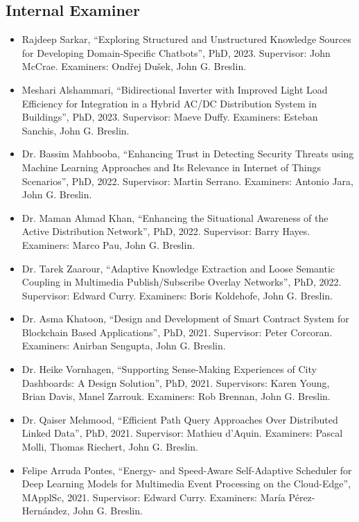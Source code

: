 \documentclass[10pt,a4paper]{res} %
\begin{document}
\begin{resume}
\subsection*{Internal Examiner}

\begin{itemize} \itemsep -2pt
\item Rajdeep Sarkar, ``Exploring Structured and Unstructured Knowledge Sources for Developing Domain-Specific Chatbots'', PhD, 2023. Supervisor: John McCrae. Examiners: Ond\v{r}ej Du\v{s}ek, John G. Breslin.
\item Meshari Alshammari, ``Bidirectional Inverter with Improved Light Load Efficiency for Integration in a Hybrid AC/DC Distribution System in Buildings'', PhD, 2023. Supervisor: Maeve Duffy. Examiners: Esteban Sanchis, John G. Breslin.
\item Dr. Bassim Mahbooba, ``Enhancing Trust in Detecting Security Threats using Machine Learning Approaches and Its Relevance in Internet of Things Scenarios'', PhD, 2022. Supervisor: Martin Serrano. Examiners: Antonio Jara, John G. Breslin. %
\item Dr. Maman Ahmad Khan, ``Enhancing the Situational Awareness of the Active Distribution Network'', PhD, 2022. Supervisor: Barry Hayes. Examiners: Marco Pau, John G. Breslin. %
\item Dr. Tarek Zaarour, ``Adaptive Knowledge Extraction and Loose Semantic Coupling in Multimedia Publish/Subscribe Overlay Networks'', PhD, 2022. Supervisor: Edward Curry. Examiners: Boris Koldehofe, John G. Breslin. %
\item Dr. Asma Khatoon, ``Design and Development of Smart Contract System for Blockchain Based Applications'', PhD, 2021. Supervisor: Peter Corcoran. Examiners: Anirban Sengupta, John G. Breslin. %
\item Dr. Heike Vornhagen, ``Supporting Sense-Making Experiences of City Dashboards: A Design Solution'', PhD, 2021. Supervisors: Karen Young, Brian Davis, Manel Zarrouk. Examiners: Rob Brennan, John G. Breslin. %
\item Dr. Qaiser Mehmood, ``Efficient Path Query Approaches Over Distributed Linked Data'', PhD, 2021. Supervisor: Mathieu d'Aquin. Examiners: Pascal Molli, Thomas Riechert, John G. Breslin.
\item Felipe Arruda Pontes, ``Energy- and Speed-Aware Self-Adaptive Scheduler for Deep Learning Models for Multimedia Event Processing on the Cloud-Edge'', MApplSc, 2021. Supervisor: Edward Curry. Examiners: Mar\'{i}a P\'{e}rez-Hern\'{a}ndez, John G. Breslin.

\end{itemize}
\end{resume}
\end{document}
